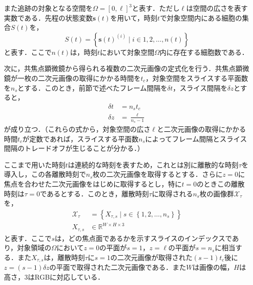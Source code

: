 また追跡の対象となる空間を$\Omega = \left[0, \ell\right]^3$と表す．ただし$\ell$は空間の広さを表す実数である．先程の状態変数$\bm{s}(t)$を用いて，時刻$t$で対象空間内にある細胞の集合$S(t)$を，
\begin{equation}
    \label{eq:set_of_cells_at_time}
    S(t) = \left\{\bm{s}(t)^{(i)} \mid i \in 1,2,\dots,n(t)\right\}
\end{equation}
と表す．ここで$n(t)$は，時刻$t$において対象空間$\Omega$内に存在する細胞数である．

次に，共焦点顕微鏡から得られる複数の二次元画像の定式化を行う．共焦点顕微鏡が一枚の二次元画像の取得にかかる時間を$t_c$，対象空間をスライスする平面数を$n_s$とする．このとき，前節で述べたフレーム間隔を$\delta t$，スライス間隔を$\delta z$とすると，
\begin{equation}
    \label{eq:delta_time_and_z}
    \begin{aligned}
        \delta t &= n_s  t_c
        \\ \delta z &= \frac{\ell}{n_s - 1}
    \end{aligned}
\end{equation}
が成り立つ．（これらの式から，対象空間の広さ$\ell$と二次元画像の取得にかかる時間$t_c$が定数であれば，スライスする平面数$n_s$によってフレーム間隔とスライス間隔のトレードオフが生じることが分かる．）

ここまで用いた時刻$t$は連続的な時刻を表すため，これとは別に離散的な時刻$\tau$を導入し，この各離散時刻で$n_s$枚の二次元画像を取得するとする．さらに$z = 0$に焦点を合わせた二次元画像をはじめに取得するとし，特に$t = 0$のときこの離散時刻は$\tau = 0$であるとする．このとき，離散時刻$\tau$に取得される$n_s$枚の画像群$\mathcal{X}_{\tau}$を，
\begin{equation}
    \label{eq:sliced_images}
    \begin{aligned}
        \mathcal{X}_{\tau} &= \left\{X_{\tau, s} \mid s \in \left\{1, 2, \dots, n_s\right\}\right\}
        \\ X_{\tau, s} &\in \mathbb{R}^{W \times H \times 3}
    \end{aligned}
\end{equation}
と表す．ここで$s$は，どの焦点面であるかを示すスライスのインデックスであり，対象領域の$\Omega$において$z = 0$の平面が$s=1$，$z = \ell$の平面が$s=n_s$に相当する．また$X_{\tau, s}$は，離散時刻$\tau$に$s = 1$の二次元画像が取得された$(s - 1) t_c$後に$z = (s - 1) \delta z$の平面で取得された二次元画像である．また$W$は画像の幅，$H$は高さ，$3$はRGBに対応している．

